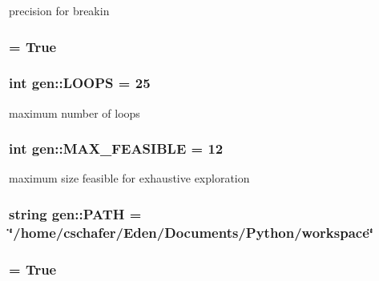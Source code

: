 precision for breakin 

\hypertarget{namespacegen_362c029b7eeb5fb3c67104ac5a218849}{
\subsubsection[{hasrpy}]{ = True}}
\label{namespacegen_362c029b7eeb5fb3c67104ac5a218849}


\hypertarget{namespacegen_257a6a4ead271854ce0abaee1e27ce1d}{
\subsubsection[{LOOPS}]{\setlength{\rightskip}{0pt plus 5cm}int {\bf gen::LOOPS} = 25}}
\label{namespacegen_257a6a4ead271854ce0abaee1e27ce1d}


maximum number of loops 

\hypertarget{namespacegen_d75234477e080aeb312e8cb2813d5ba6}{
\subsubsection[{MAX\_\-FEASIBLE}]{\setlength{\rightskip}{0pt plus 5cm}int {\bf gen::MAX\_\-FEASIBLE} = 12}}
\label{namespacegen_d75234477e080aeb312e8cb2813d5ba6}


maximum size feasible for exhaustive exploration 

\hypertarget{namespacegen_cd9fd05ba9face577992611e21fd84ca}{
\subsubsection[{PATH}]{\setlength{\rightskip}{0pt plus 5cm}string {\bf gen::PATH} = \char`\"{}/home/cschafer/Eden/Documents/Python/workspace\char`\"{}}}
\label{namespacegen_cd9fd05ba9face577992611e21fd84ca}


\hypertarget{namespacegen_448acbda618185ee4482080762551d0c}{
\subsubsection[{WEAVE}]{ = True}}
\label{namespacegen_448acbda618185ee4482080762551d0c}


